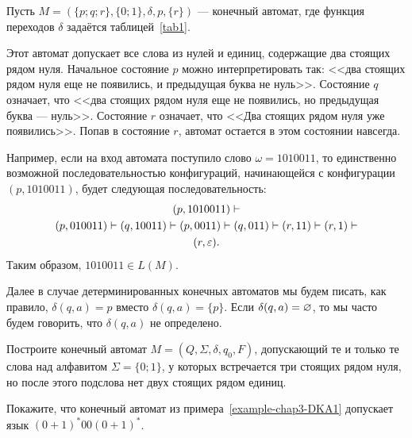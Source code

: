 \begin{myexample}
\label{example-chap3-DKA1}
Пусть $M=(\{p;q;r\},\{0;1\},\delta,p,\{r\})$ --- конечный автомат, где функция переходов $\delta$ задаётся таблицей~\ref{tab1}. 

Этот автомат допускает все слова из нулей и единиц, содержащие два стоящих рядом нуля. Начальное состояние $p$ можно интерпретировать так: <<два стоящих рядом нуля еще не появились, и предыдущая буква не нуль>>. Состояние $q$ означает, что <<два стоящих рядом нуля еще не появились, но предыдущая буква --- нуль>>. Состояние $r$ означает, что <<Два стоящих рядом нуля уже появились>>. Попав в состояние $r$, автомат остается в этом состоянии навсегда.

Например, если на вход автомата поступило слово $\omega=1010011$, то единственно возможной последовательностью конфигураций, начинающейся с конфигурации $(p,1010011)$, будет следующая последовательность:
\begin{multline}
(p,1010011)
    \vdash\\(p,010011)
    \vdash(q,10011)
    \vdash(p,0011)
    \vdash(q,011)
    \vdash(r,11)
    \vdash(r,1)
    \vdash\\(r,\varepsilon).
\end{multline}
Таким образом, $1010011\in L(M)$.
\end{myexample}

Далее в случае детерминированных конечных автоматов мы будем писать, как правило, $\delta(q,a)=p$ вместо $\delta(q,a)=\{p\}$. Если $\delta(q,a)=\varnothing$, то мы часто будем говорить, что $\delta(q,a)$ не определено.

\begin{myproblem}
Построите конечный автомат $M=(Q,\Sigma,\delta,q_0,F)$, допускающий те и только те слова над алфавитом $\Sigma=\{0;1\}$, у которых встречается три стоящих рядом нуля, но после этого подслова нет двух стоящих рядом единиц.
\end{myproblem}

\begin{myproblem}
Покажите, что конечный автомат из примера~\ref{example-chap3-DKA1} допускает язык $(0+1)^*00(0+1)^*$.
\end{myproblem}

